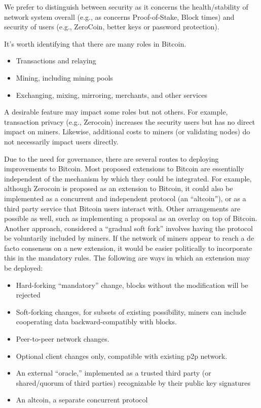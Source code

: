 We prefer to distinguish between security as it concerns the health/stability of network system overall (e.g., as concerns Proof-of-Stake, Block times) and security of users (e.g., ZeroCoin, better keys or password protection).

It's worth identifying that there are many roles in Bitcoin.
\begin{itemize}
\item Transactions and relaying
\item Mining, including mining pools
\item Exchanging, mixing, mirroring, merchants, and other services
\end{itemize}
A desirable feature may impact some roles but not others. For example, transaction privacy (e.g., Zerocoin) increases the security users but has no direct impact on miners. Likewise, additional costs to miners (or validating nodes) do not necessarily impact users directly.

Due to the need for governance, there are several routes to deploying improvements to Bitcoin. Most proposed extensions to Bitcoin are essentially independent of the mechanism by which they could be integrated. For example, although Zerocoin is proposed as an extension to Bitcoin, it could also be implemented as a concurrent and independent protocol (an ``altcoin''), or as a third party service that Bitcoin users interact with. Other arrangements are possible as well, such as implementing a proposal as an overlay on top of Bitcoin. Another approach, considered a ``gradual soft fork'' involves having the protocol be voluntarily included by miners. If the network of miners appear to reach a de facto consensus on a new extension, it would be easier politically to incorporate this in the mandatory rules. The following are ways in which an extension may be deployed:

\begin{itemize}
\item Hard-forking ``mandatory'' change, blocks without the modification will be rejected
\item Soft-forking changes, for subsets of existing possibility, miners can include cooperating data backward-compatibly with blocks.
\item Peer-to-peer network changes.
\item Optional client changes only, compatible with existing p2p network.
\item An external ``oracle,'' implemented as a trusted third party (or shared/quorum of third parties) recognizable by their public key signatures
\item An altcoin, a separate concurrent protocol
\end{itemize}

